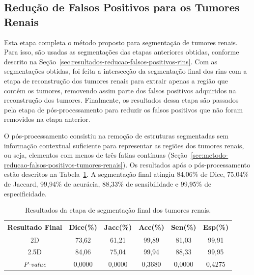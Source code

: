 \subsection{Redução de Falsos Positivos para os Tumores Renais}
\label{sec:resultados-reducao-falsos-positivos-tumores-renais}

Esta etapa completa o método proposto para segmentação de tumores renais. Para isso, são usadas as segmentações das etapas anteriores obtidas, conforme descrito na Seção~\ref{sec:resultados-reducao-falsos-positivos-rins}. Com as segmentações obtidas, foi feita a intersecção da segmentação final dos rins com a etapa de reconstrução dos tumores renais para extrair apenas a região que contém os tumores, removendo assim parte dos falsos positivos adquiridos na reconstrução dos tumores. Finalmente, os resultados dessa etapa são passados pela etapa de pós-processamento para reduzir os falsos positivos que não foram removidos na etapa anterior. 

O pós-processamento consistiu na remoção de estruturas segmentadas sem informação contextual suficiente para representar as regiões dos tumores renais, ou seja, elementos com menos de três fatias contínuas (Seção~\ref{sec:metodo-reducao-falsos-positivos-tumores-renais}). Os resultados após o pós-processamento estão descritos na Tabela~\ref{tab:seg-final-tumores-renais}. A segmentação final atingiu 84,06\% de Dice, 75,04\% de Jaccard, 99,94\% de acurácia, 88,33\% de sensibilidade e 99,95\% de especificidade.

\begin{table}[!ht]
\caption{Resultados da etapa de segmentação final dos tumores renais.}
\label{tab:seg-final-tumores-renais}
\centering
\begin{tabular}{c|c|c|c|c|c}
\hline
Resultado Final  & Dice(\%)                      & Jacc(\%)                      & Acc(\%) & Sen(\%)                       & Esp(\%) \\ \hline
2D               & 73,62                          & 61,21                          & 99,89    & 81,03                          & 99,91    \\ \hline
2.5D             & 84,06                          & 75,04                          & 99,94    & 88,33                          & 99,95    \\ \hline
\textit{P-value} & \cellcolor[HTML]{C0C0C0}0,0000 & \cellcolor[HTML]{C0C0C0}0,0000 & 0,3680   & \cellcolor[HTML]{C0C0C0}0,0000 & 0,4275   \\ \hline
\end{tabular}
\end{table}

